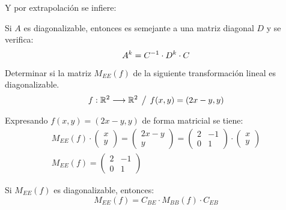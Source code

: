 Y por extrapolación se infiere:

\begin{mdframed}[style=PropertyFrame]
    \begin{prop}
    \end{prop}
    Si $A$ es diagonalizable, entonces es semejante a una matriz diagonal $D$ y se verifica:
    \begin{equation*}
        A^k = C^{-1} \cdot D^k \cdot C
    \end{equation*}
\end{mdframed}

\begin{mdframed}[style=ExampleFrame]
    \begin{example}
    \end{example}
    Determinar si la matriz $M_{EE}(f)$ de la siguiente transformación lineal es diagonalizable.
    \begin{equation*}
        f:\mathbb{R}^2\longrightarrow\mathbb{R}^2\hspace{1ex} \big/ \hspace{1ex} f(x,y)=(2x-y , y)
    \end{equation*}
    
    Expresando $f(x,y)=(2x-y , y)$ de forma matricial se tiene:
    \begin{gather*}
        M_{EE}(f) \cdot
        \begin{pmatrix}
            x
            \\
            y
        \end{pmatrix}
        =
        \begin{pmatrix}
            2x-y
            \\
            y
        \end{pmatrix}
        =
        \begin{pmatrix}
            2 & -1
            \\
            0 & 1
        \end{pmatrix}
        \cdot
        \begin{pmatrix}
            x
            \\
            y
        \end{pmatrix}
        \\[1ex]
        M_{EE}(f) =
        \begin{pmatrix}
            2 & -1
            \\
            0 & 1
        \end{pmatrix}
    \end{gather*}
    
    Si $M_{EE}(f)$ es diagonalizable, entonces:
    \begin{equation*}
        M_{EE}(f) = C_{BE} \cdot M_{BB}(f) \cdot C_{EB}
    \end{equation*}
    

\end{mdframed}
